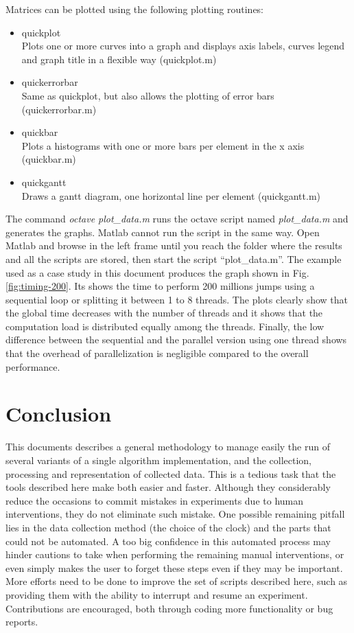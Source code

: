 Matrices can be plotted using the following plotting routines:
\begin{itemize}
\item quickplot\\
Plots one or more curves into a graph and displays axis labels, curves legend and graph title in a flexible way (quickplot.m)
\item quickerrorbar\\
Same as quickplot, but also allows the plotting of error bars (quickerrorbar.m)
\item quickbar\\
Plots a histograms with one or more bars per element in the x axis (quickbar.m)
\item quickgantt\\
Draws a gantt diagram, one horizontal line per element (quickgantt.m)
\end{itemize}

The command \emph{octave plot\_data.m} runs the octave script named \emph{plot\_data.m} and generates the graphs. Matlab cannot run the script in the same way. Open Matlab and browse in the left frame until you reach the folder where the results and all the scripts are stored, then start the script ``plot\_data.m''. The example used as a case study in this document produces the graph shown in Fig.\ref{fig:timing-200}. Its shows the time to perform 200 millions jumps using a sequential loop or splitting it between 1 to 8 threads. The plots clearly show that the global time decreases with the number of threads and it shows that the computation load is distributed equally among the threads. Finally, the low difference between the sequential and the parallel version using one thread shows that the overhead of parallelization is negligible compared to the overall performance.

\section{Conclusion}
\label{sec:conclusion}
This documents describes a general methodology to manage easily the run of several variants of a single algorithm implementation, and the collection, processing and representation of collected data. This is a tedious task that the tools described here make both easier and faster. Although they considerably reduce the occasions to commit mistakes in experiments due to human interventions, they do not eliminate such mistake. One possible remaining pitfall lies in the data collection method (the choice of the clock) and the parts that could not be automated. A too big confidence in this automated process may hinder cautions to take when performing the remaining manual interventions, or even simply makes the user to forget these steps even if they may be important. More efforts need to be done to improve the set of scripts described here, such as providing them with the ability to interrupt and resume an experiment. Contributions are encouraged, both through coding more functionality or bug reports.

